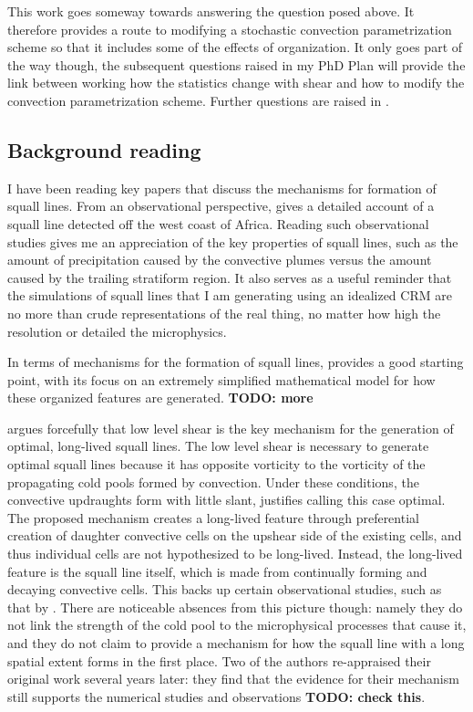 \documentclass[11pt,a4paper]{article}
\newcommand\todo[1]{\textbf{TODO: #1}}
\begin{document}
This work goes someway towards answering the question posed above. It therefore provides a route to modifying a stochastic convection parametrization scheme so that it includes some of the effects of organization. It only goes part of the way though, the subsequent questions raised in my PhD Plan will provide the link between working how the statistics change with shear and how to modify the convection parametrization scheme. Further questions are raised in \cite{muetz2017effects}. 

\subsection{Background reading}

I have been reading key papers that discuss the mechanisms for formation of squall lines. From an
observational perspective, \cite{houze1977structure} gives a detailed account of a squall line detected off the west coast of Africa. Reading such observational studies gives me an appreciation of the key properties of squall lines, such as the amount of precipitation caused by the convective plumes versus the amount caused by the trailing stratiform region.  It also serves as a useful reminder that the simulations of squall lines that I am generating using an idealized CRM are no more than crude representations of the real thing, no matter how high the resolution or detailed the microphysics.

In terms of mechanisms for the formation of squall lines, \cite{TMM1982} provides a good starting point, with its focus on an extremely simplified mathematical model for how these organized features are generated. \todo{more}

\cite{RKW1988} argues forcefully that low level shear is the key mechanism for the generation of optimal, long-lived squall lines. The low level shear is necessary to generate optimal squall lines because it has opposite vorticity to the vorticity of the propagating cold pools formed by convection. Under these conditions, the convective updraughts form with little slant, justifies calling this case optimal. The proposed mechanism creates a long-lived feature through preferential creation of daughter convective cells on the upshear side of the existing cells, and thus individual cells are not hypothesized to be long-lived. Instead, the long-lived feature is the squall line itself, which is made from continually forming and decaying convective cells. This backs up certain observational studies, such as that by \cite{houze1977structure}. There are noticeable absences from this picture though: namely they do not link the strength of the cold pool to the microphysical processes that cause it, and they do not claim to provide a mechanism for how the squall line with a long spatial extent forms in the first place. Two of the authors re-appraised their original work several years later: they find that the evidence for their mechanism still supports the numerical studies and observations \todo{check this}.
\end{document}
